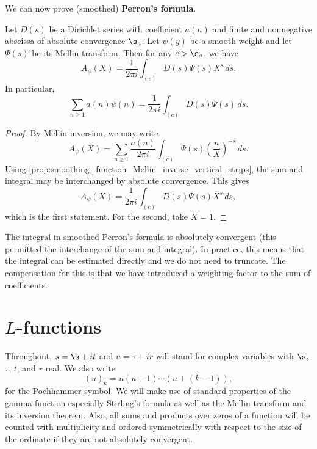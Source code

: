 \documentclass[12pt]{article}
\begin{document}
      We can now prove (smoothed) \textbf{Perron's formula}.

      \begin{theorem*}
        Let \(D(s)\) be a Dirichlet series with coefficient \(a(n)\) and finite and nonnegative abscissa of absolute convergence \(\s_{a}\). Let \(\psi(y)\) be a smooth weight and let \(\Psi(s)\) be its Mellin transform. Then for any \(c > \s_{a}\), we have
        \[
          A_{\psi}(X) = \frac{1}{2\pi i}\int_{(c)}D(s)\Psi(s)X^{s}\,ds.
        \]
        In particular,
        \[
          \sum_{n \ge 1}a(n)\psi(n) = \frac{1}{2\pi i}\int_{(c)}D(s)\Psi(s)\,ds.
        \]
      \end{theorem*}
      \begin{proof}
        By Mellin inversion, we may write
        \[
          A_{\psi}(X) = \sum_{n \ge 1}\frac{a(n)}{2\pi i}\int_{(c)}\Psi(s)\left(\frac{n}{X}\right)^{-s}\,ds.
        \]
        Using \cref{prop:smoothing_function_Mellin_inverse_vertical_strips}, the sum and integral may be interchanged by absolute convergence. This gives
        \[
          A_{\psi}(X) = \frac{1}{2\pi i}\int_{(c)}D(s)\Psi(s)X^{s}\,ds,
        \]
        which is the first statement. For the second, take \(X = 1\).
      \end{proof}

      The integral in smoothed Perron's formula is absolutely convergent (this permitted the interchange of the sum and integral). In practice, this means that the integral can be estimated directly and we do not need to truncate. The compensation for this is that we have introduced a weighting factor to the sum of coefficients.
  \section{\texorpdfstring{\(L\)}{L}-functions}
    Throughout, \(s = \s+it\) and \(u = \tau+ir\) will stand for complex variables with \(\s\), \(\tau\), \(t\), and \(r\) real. We also write
    \[
      (u)_{k} = u(u+1) \cdots (u+(k-1)),
    \]
    for the Pochhammer symbol. We will make use of standard properties of the gamma function especially Stirling's formula as well as the Mellin transform and its inversion theorem. Also, all sums and products over zeros of a function will be counted with multiplicity and ordered symmetrically with respect to the size of the ordinate if they are not absolutely convergent.
\end{document}

